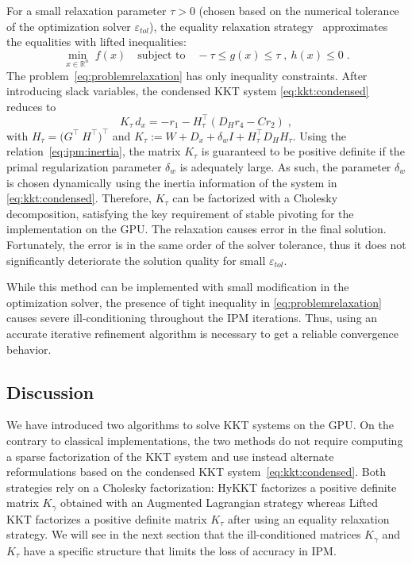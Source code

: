 For a small relaxation parameter $\tau > 0$ (chosen based on the numerical tolerance of the optimization solver
$\varepsilon_{tol}$), the equality relaxation strategy~\cite{shin2023accelerating} approximates
the equalities with lifted inequalities:
\begin{equation}
  \label{eq:problemrelaxation}
    \min_{x \in \mathbb{R}^n} \;  f(x)
\quad \text{subject to}\quad
     - \tau \leq g(x) \leq \tau \;,~  h(x) \leq 0  \; .
\end{equation}
The problem~\eqref{eq:problemrelaxation} has only inequality constraints.
After introducing slack variables, the condensed KKT system \eqref{eq:kkt:condensed} reduces to
\begin{equation}
  \label{eq:liftedkkt}
    K_\tau \,d_x = - r_1 - H_\tau^\top(D_H r_4 - C r_2) \; ,
\end{equation}
with $H_\tau = \big(G^\top ~ H^\top \big)^\top$ and
$K_\tau := W + D_x + \delta_w I + H_\tau^\top D_H H_\tau$.
Using the relation~\eqref{eq:ipm:inertia}, the matrix $K_\tau$
is guaranteed to be positive definite if the primal regularization parameter $\delta_w$ is adequately large.
As such, the parameter $\delta_w$ is chosen dynamically using the inertia information of the system in \eqref{eq:kkt:condensed}.
Therefore, $K_\tau$ can be factorized with a Cholesky decomposition, satisfying the key requirement of stable pivoting for the implementation on the GPU. The relaxation causes error in the final solution.
Fortunately, the error is in the same order of the solver tolerance, thus it does not significantly deteriorate the solution quality for small $\varepsilon_{tol}$.

While this method can be implemented with small modification in the optimization solver, the presence of tight inequality in \eqref{eq:problemrelaxation} causes severe ill-conditioning throughout the IPM iterations. Thus,
using an accurate iterative refinement algorithm is necessary to get a reliable convergence behavior.

\subsection{Discussion}
We have introduced two algorithms to solve
KKT systems on the GPU. On the contrary to classical implementations,
the two methods do not require computing a sparse \lblt factorization of the KKT
system and use instead alternate reformulations based on the condensed KKT
system~\eqref{eq:kkt:condensed}. Both strategies
rely on a Cholesky factorization: HyKKT factorizes a positive
definite matrix $K_\gamma$ obtained with an Augmented Lagrangian strategy
whereas Lifted KKT factorizes a positive definite matrix $K_\tau$
after using an equality relaxation strategy.
We will see in the next section that the ill-conditioned matrices $K_\gamma$ and $K_\tau$
have a specific structure that limits the loss of accuracy in IPM.


